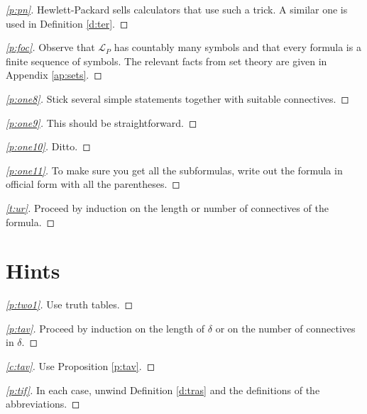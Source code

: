 \documentclass[12pt]{amsbook}
\theoremstyle{plain}
\theoremstyle{definition}
\theoremstyle{remark}
\newenvironment{clue}[1]%
{\begin{proof}[\ref{#1}]}%
{\renewcommand{\qed}{}\end{proof}}
\begin{document}
\begin{clue}{p:pn}
Hewlett-Packard sells calculators that use such a trick.  A similar one is used in Definition \ref{d:ter}.
\end{clue}

\begin{clue}{p:foc}
Observe that $\mathcal{L}_P$ has countably many symbols and that every formula is a finite sequence of symbols.  The relevant facts from set theory are given in Appendix \ref{ap:sets}.
\end{clue}

\begin{clue}{p:one8}
Stick several simple statements together with suitable connectives.
\end{clue}

\begin{clue}{p:one9}
This should be straightforward.
\end{clue}

\begin{clue}{p:one10}
Ditto.
\end{clue}

\begin{clue}{p:one11}
To make sure you get all the subformulas,  write out the formula in official form with all the parentheses.
\end{clue}

\begin{clue}{t:ur}
Proceed by induction on the length or number of connectives of the formula.
\end{clue}


%
%

\chapter{Hints}

\begin{clue}{p:two1}
Use truth tables.
\end{clue}

\begin{clue}{p:tav}
Proceed by induction on the length of $\delta$ or on the number of connectives in $\delta$.
\end{clue}

\begin{clue}{c:tav}
Use Proposition \ref{p:tav}.
\end{clue}

\begin{clue}{p:tif}
In each case,  unwind Definition \ref{d:tras} and the definitions of the abbreviations.
\end{clue}
\end{document}
